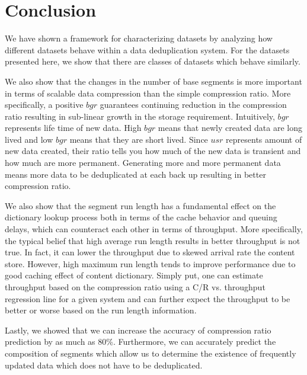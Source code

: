 \section{Conclusion}\label{con}
We have shown a framework for characterizing datasets by analyzing how different datasets behave within a data deduplication system. For the datasets presented here, we show that there are classes of datasets which behave similarly.

We also show that the changes in the number of base segments is more important in terms of scalable data compression than the simple compression ratio. More specifically, a positive $bgr$ guarantees continuing reduction in the compression ratio resulting in sub-linear growth in the storage requirement. Intuitively, $bgr$ represents life time of new data. High $bgr$ means that newly created data are long lived and low $bgr$ means that they are short lived. Since $usr$ represents amount of new data created, their ratio tells you how much of the new data is transient and how much are more permanent. Generating more and more permanent data means more data to be deduplicated at each back up resulting in better compression ratio.  

We also show that the segment run length has a fundamental effect on the dictionary lookup process both in terms of the cache behavior and queuing delays, which can counteract each other in terms of throughput. More specifically, the typical belief that high average run length results in better throughput is not true. In fact, it can lower the throughput due to skewed arrival rate the content store. However, high maximum run length tends to improve performance due to good caching effect of content dictionary. Simply put, one can estimate throughput based on the compression ratio using a C/R vs. throughput regression line for a given system and can further expect the throughput to be better or worse based on the run length information.

Lastly, we showed that we can increase the accuracy of compression ratio prediction by as much as 80\%. Furthermore, we can accurately predict the composition of segments which allow us to determine the existence of frequently updated data which does not have to be deduplicated. 

